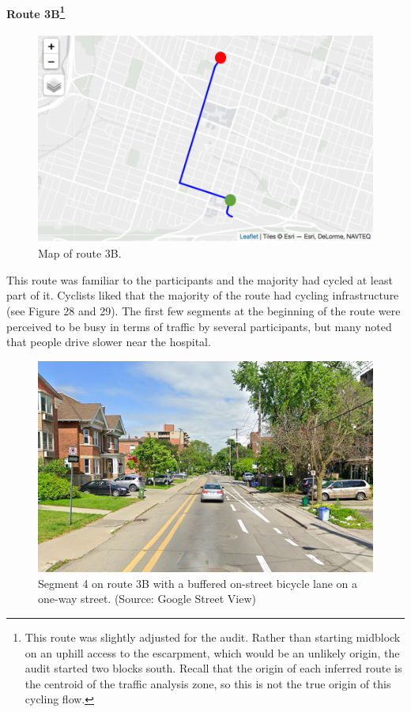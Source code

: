\documentclass[]{elsarticle} %
\begin{document}
\hypertarget{route-3b}{%
\paragraph[Route 3B]{\texorpdfstring{Route 3B\footnote{This route was
  slightly adjusted for the audit. Rather than starting midblock on an
  uphill access to the escarpment, which would be an unlikely origin,
  the audit started two blocks south. Recall that the origin of each
  inferred route is the centroid of the traffic analysis zone, so this
  is not the true origin of this cycling flow.}}{Route 3B}}\label{route-3b}}

\begin{figure}

{\centering \includegraphics[width=0.65\linewidth]{Route 3B} 

}

\caption{Map of route 3B.}\label{fig:figure-27}
\end{figure}

This route was familiar to the participants and the majority had cycled
at least part of it. Cyclists liked that the majority of the route had
cycling infrastructure (see Figure 28 and 29). The first few segments at
the beginning of the route were perceived to be busy in terms of traffic
by several participants, but many noted that people drive slower near
the hospital.

\begin{figure}

{\centering \includegraphics[width=0.65\linewidth]{Figure 27} 

}

\caption{Segment 4 on route 3B with a buffered on-street bicycle lane on a one-way street. (Source: Google Street View)}\label{fig:figure-28}
\end{figure}
\end{document}
